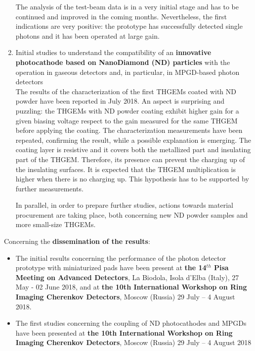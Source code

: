 \begin{enumerate}
     \par
     The analysis of the test-beam data is in a very initial stage and has to be continued and improved in the coming months. Nevertheless, the first indications are very positive: the prototype has successfully detected single photons and it has been operated at large gain.
\item
Initial studies to understand the 
compatibility of an \textbf{innovative photocathode 
based on NanoDiamond (ND) particles} with the 
operation in gaseous detectors and, in 
particular, in MPGD-based photon detectors\\
The results of the characterization of the first THGEMs 
coated with ND powder have been reported in July 2018. 
An aspect is surprising and puzzling: the THGEMs with
ND powder coating exhibit 
higher gain for a given biasing voltage respect 
to the gain measured for 
the same THGEM before applying the coating.
The characterization measurements have been repeated, confirming 
the result, while a possible explanation is emerging.
The coating layer is resistive and it covers both the 
metallized part and insulating part of the THGEM. 
Therefore, its presence can prevent
 the charging up of the insulating surfaces. 
It is expected that the THGEM multiplication is 
higher when there is no charging up. This hypothesis 
has to be supported by further measurements. 
\par
In parallel, in order to prepare further studies, actions towards material procurement 
are taking place, 
both concerning new ND powder samples and more small-size THGEMs.
\end{enumerate}    
\par
Concerning the \textbf{dissemination of the results}:
\begin{itemize}
\item The initial results concerning the performance of the photon
detector prototype with miniaturized pads have been present at 
\textbf{the 
14$^{th}$ Pisa Meeting on Advanced Detectors},
La Biodola, Isola d'Elba (Italy), 27 May - 02 June 2018,
\cite{AGARWALA2018-2} and at \textbf{the 
10th International Workshop on Ring Imaging Cherenkov Detectors}, 
Moscow (Russia) 29 July – 4 August 2018.
\item The first studies concerning the coupling of ND photocathodes and MPGDs have been presented at \textbf{the 
10th International Workshop on Ring Imaging Cherenkov Detectors}, 
Moscow (Russia) 29 July – 4 August 2018\cite{Agarwala:2018qdm} \end{itemize}
